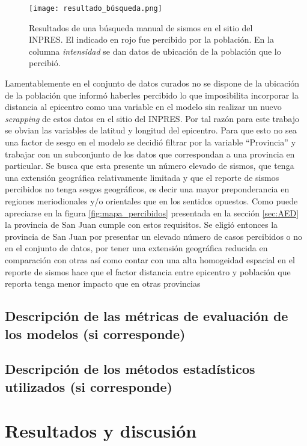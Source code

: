 \documentclass[a4paper]{report}
\begin{document}
\begin{figure}[h]
\centering
\texttt{[image: resultado\_búsqueda.png]}
\caption{Resultados de una búsqueda manual de sismos en el sitio del INPRES. El indicado en rojo fue percibido por la población. En la columna \emph{intensidad} se dan datos de ubicación de la población que lo percibió.}
\label{fig:resultado_búsqueda}
\end{figure}

Lamentablemente en el conjunto de datos curados no se dispone de la ubicación de la población que informó haberles percibido lo que imposibilita incorporar la distancia al epicentro como una variable en el modelo sin realizar un nuevo \emph{scrapping} de estos datos en el sitio del INPRES.
Por tal razón para este trabajo se obvian las variables de latitud y longitud del epicentro.
Para que esto no sea una factor de sesgo en el modelo se decidió filtrar por la variable ``Provincia'' y trabajar con un subconjunto de los datos que correspondan a una provincia en particular.
Se busca que esta presente un número elevado de sismos, que tenga una extensión geográfica relativamente limitada y que el reporte de sismos percibidos no tenga sesgos geográficos, es decir una mayor preponderancia en regiones meriodionales y/o orientales que en los sentidos opuestos.
Como puede apreciarse en la figura \ref{fig:mapa_percibidos} presentada en la sección \ref{sec:AED} la provincia de San Juan cumple con estos requisitos.
Se eligió entonces la provincia de San Juan por presentar un elevado número de casos percibidos o no en el conjunto de datos, por tener una extensión geográfica reducida en comparación con otras así como contar con una alta homogeidad espacial en el reporte de sismos hace que el factor distancia entre epicentro y población que reporta tenga menor impacto que en otras provincias


\section{Descripción de las métricas de evaluación de los modelos (si corresponde)}



\section{Descripción de los métodos estadísticos utilizados (si corresponde)}






\chapter{Resultados y discusión}
\end{document}
